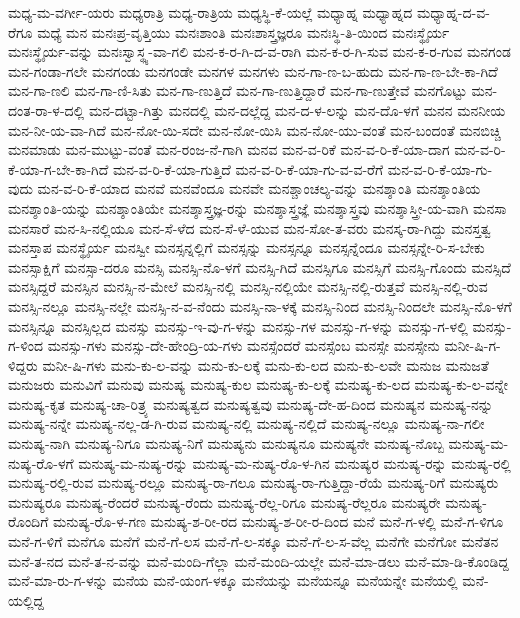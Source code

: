 {ಮಧ್ಯ-ಮ-ವರ್ಗೀ-ಯರು
ಮಧ್ಯರಾತ್ರಿ
ಮಧ್ಯ-ರಾತ್ರಿಯ
ಮಧ್ಯಸ್ಥಿ-ಕೆ-ಯಲ್ಲೆ
ಮಧ್ಯಾಹ್ನ
ಮಧ್ಯಾಹ್ನದ
ಮಧ್ಯಾಹ್ನ-ದ-ವ-ರೆಗೂ
ಮಧ್ಯೆ
ಮನ
ಮನಃಪ್ರ-ವೃತ್ತಿಯು
ಮನಃಶಾಂತಿ
ಮನಃಶಾಸ್ತ್ರಜ್ಞರೂ
ಮನಃಸ್ಥಿ-ತಿ-ಯಿಂದ
ಮನಃಸ್ಥೈರ್ಯ
ಮನಃಸ್ಥೈರ್ಯ-ವನ್ನು
ಮನಃಸ್ವಾಸ್ಥ್ಯ-ವಾ-ಗಲಿ
ಮನ-ಕ-ರ-ಗಿ-ದ-ವ-ರಾಗಿ
ಮನ-ಕ-ರ-ಗಿ-ಸುವ
ಮನ-ಕ-ರ-ಗುವ
ಮನಗಂಡ
ಮನ-ಗಂಡಾ-ಗಲೇ
ಮನಗಂಡು
ಮನಗಂಡೇ
ಮನಗಳ
ಮನಗಳು
ಮನ-ಗಾ-ಣ-ಬ-ಹುದು
ಮನ-ಗಾ-ಣ-ಬೇ-ಕಾ-ಗಿದೆ
ಮನ-ಗಾ-ಣಲಿ
ಮನ-ಗಾ-ಣಿ-ಸಿತು
ಮನ-ಗಾ-ಣುತ್ತಿದೆ
ಮನ-ಗಾ-ಣುತ್ತಿದ್ದಾರೆ
ಮನ-ಗಾ-ಣುತ್ತೇವೆ
ಮನಗೊಟ್ಟು
ಮನ-ದಂತ-ರಾ-ಳ-ದಲ್ಲಿ
ಮನ-ದಟ್ಟಾ-ಗಿತ್ತು
ಮನದಲ್ಲಿ
ಮನ-ದಲ್ಲೆದ್ದ
ಮನ-ದ-ಳ-ಲನ್ನು
ಮನ-ದೊ-ಳಗೆ
ಮನನ
ಮನನೀಯ
ಮನ-ನೀ-ಯ-ವಾ-ಗಿದೆ
ಮನ-ನೋ-ಯಿ-ಸದೇ
ಮನ-ನೋ-ಯಿಸಿ
ಮನ-ನೋ-ಯು-ವಂತೆ
ಮನ-ಬಂದಂತೆ
ಮನಬಿಚ್ಚಿ
ಮನಮಾಡು
ಮನ-ಮುಟ್ಟು-ವಂತೆ
ಮನ-ರಂಜ-ನೆ-ಗಾಗಿ
ಮನವ
ಮನ-ವ-ರಿಕೆ
ಮನ-ವ-ರಿ-ಕೆ-ಯಾ-ದಾಗ
ಮನ-ವ-ರಿ-ಕೆ-ಯಾ-ಗ-ಬೇ-ಕಾ-ಗಿದೆ
ಮನ-ವ-ರಿ-ಕೆ-ಯಾ-ಗುತ್ತಿದೆ
ಮನ-ವ-ರಿ-ಕೆ-ಯಾ-ಗು-ವ-ವ-ರೆಗೆ
ಮನ-ವ-ರಿ-ಕೆ-ಯಾ-ಗು-ವುದು
ಮನ-ವ-ರಿ-ಕೆ-ಯಾದ
ಮನವೆ
ಮನವೆಂದೂ
ಮನವೇ
ಮನಶ್ಚಾಂಚಲ್ಯ-ವನ್ನು
ಮನಶ್ಶಾಂತಿ
ಮನಶ್ಶಾಂತಿಯ
ಮನಶ್ಶಾಂತಿ-ಯನ್ನು
ಮನಶ್ಶಾಂತಿಯೇ
ಮನಶ್ಶಾಸ್ತ್ರಜ್ಞ-ರನ್ನು
ಮನಶ್ಶಾಸ್ತ್ರಜ್ಞೆ
ಮನಶ್ಶಾಸ್ತ್ರವು
ಮನಶ್ಶಾಸ್ತ್ರೀ-ಯ-ವಾಗಿ
ಮನಸಾ
ಮನಸಾರೆ
ಮನ-ಸಿ-ನಲ್ಲಿಯೂ
ಮನ-ಸೆ-ಳೆದ
ಮನ-ಸೆ-ಳೆ-ಯುವ
ಮನ-ಸೋ-ತ-ವರು
ಮನಸ್ಕ-ರಾ-ಗಿದ್ದು
ಮನಸ್ತತ್ವ
ಮನಸ್ತಾಪ
ಮನಸ್ಥೈರ್ಯ
ಮನಸ್ವೀ
ಮನಸ್ಸನ್ನಲ್ಲಿಗೆ
ಮನಸ್ಸನ್ನು
ಮನಸ್ಸನ್ನೂ
ಮನಸ್ಸನ್ನೆಂದೂ
ಮನಸ್ಸನ್ನೇ-ರಿ-ಸ-ಬೇಕು
ಮನಸ್ಸಾಕ್ಷಿಗೆ
ಮನಸ್ಸಾ-ದರೂ
ಮನಸ್ಸಿ
ಮನಸ್ಸಿ-ನೊ-ಳಗೆ
ಮನಸ್ಸಿ-ಗಿದೆ
ಮನಸ್ಸಿಗೂ
ಮನಸ್ಸಿಗೆ
ಮನಸ್ಸಿ-ಗೊಂದು
ಮನಸ್ಸಿದೆ
ಮನಸ್ಸಿದ್ದರೆ
ಮನಸ್ಸಿನ
ಮನಸ್ಸಿ-ನ-ಮೇಲೆ
ಮನಸ್ಸಿ-ನಲ್ಲಿ
ಮನಸ್ಸಿ-ನಲ್ಲಿಯೇ
ಮನಸ್ಸಿ-ನಲ್ಲಿ-ರುತ್ತವೆ
ಮನಸ್ಸಿ-ನಲ್ಲಿ-ರುವ
ಮನಸ್ಸಿ-ನಲ್ಲೂ
ಮನಸ್ಸಿ-ನಲ್ಲೇ
ಮನಸ್ಸಿ-ನ-ವ-ನೆಂದು
ಮನಸ್ಸಿ-ನಾ-ಳಕ್ಕೆ
ಮನಸ್ಸಿ-ನಿಂದ
ಮನಸ್ಸಿ-ನಿಂದಲೇ
ಮನಸ್ಸಿ-ನೊ-ಳಗೆ
ಮನಸ್ಸಿನ್ನೂ
ಮನಸ್ಸಿಲ್ಲದ
ಮನಸ್ಸು
ಮನಸ್ಸು-ಇ-ವು-ಗ-ಳನ್ನು
ಮನಸ್ಸು-ಗಳ
ಮನಸ್ಸು-ಗ-ಳನ್ನು
ಮನಸ್ಸು-ಗ-ಳಲ್ಲಿ
ಮನಸ್ಸು-ಗ-ಳಿಂದ
ಮನಸ್ಸು-ಗಳು
ಮನಸ್ಸು-ದೇ-ಹೇಂದ್ರಿ-ಯ-ಗಳು
ಮನಸ್ಸೆಂದರೆ
ಮನಸ್ಸೆಂಬ
ಮನಸ್ಸೇ
ಮನಸ್ಸೇನು
ಮನೀ-ಷಿ-ಗ-ಳಿದ್ದರು
ಮನೀ-ಷಿ-ಗಳು
ಮನು-ಕು-ಲ-ವನ್ನು
ಮನು-ಕು-ಲಕ್ಕೆ
ಮನು-ಕು-ಲದ
ಮನು-ಕು-ಲವೇ
ಮನುಜ
ಮನುಜತೆ
ಮನುಜರು
ಮನುವಿಗೆ
ಮನುವು
ಮನುಷ್ಯ
ಮನುಷ್ಯ-ಕುಲ
ಮನುಷ್ಯ-ಕು-ಲಕ್ಕೆ
ಮನುಷ್ಯ-ಕು-ಲದ
ಮನುಷ್ಯ-ಕು-ಲ-ವನ್ನೇ
ಮನುಷ್ಯ-ಕೃತ
ಮನುಷ್ಯ-ಚಾ-ರಿತ್ರ್ಯ
ಮನುಷ್ಯತ್ವದ
ಮನುಷ್ಯತ್ವವು
ಮನುಷ್ಯ-ದೇ-ಹ-ದಿಂದ
ಮನುಷ್ಯನ
ಮನುಷ್ಯ-ನನ್ನು
ಮನುಷ್ಯ-ನನ್ನೇ
ಮನುಷ್ಯ-ನಲ್ಲ-ಡ-ಗಿ-ರುವ
ಮನುಷ್ಯ-ನಲ್ಲಿ
ಮನುಷ್ಯ-ನಲ್ಲಿದೆ
ಮನುಷ್ಯ-ನಲ್ಲೂ
ಮನುಷ್ಯ-ನಾ-ಗಲೀ
ಮನುಷ್ಯ-ನಾಗಿ
ಮನುಷ್ಯ-ನಿಗೂ
ಮನುಷ್ಯ-ನಿಗೆ
ಮನುಷ್ಯನು
ಮನುಷ್ಯನೂ
ಮನುಷ್ಯನೇ
ಮನುಷ್ಯ-ನೊಬ್ಬ
ಮನುಷ್ಯ-ಮ-ನುಷ್ಯ-ರೊ-ಳಗೆ
ಮನುಷ್ಯ-ಮ-ನುಷ್ಯ-ರನ್ನು
ಮನುಷ್ಯ-ಮ-ನುಷ್ಯ-ರೊ-ಳ-ಗಿನ
ಮನುಷ್ಯರ
ಮನುಷ್ಯ-ರನ್ನು
ಮನುಷ್ಯ-ರಲ್ಲಿ
ಮನುಷ್ಯ-ರಲ್ಲಿ-ರುವ
ಮನುಷ್ಯ-ರಲ್ಲೂ
ಮನುಷ್ಯ-ರಾ-ಗಲೂ
ಮನುಷ್ಯ-ರಾ-ಗುತ್ತಿದ್ದಾ-ರೆಯೆ
ಮನುಷ್ಯ-ರಿಗೆ
ಮನುಷ್ಯರು
ಮನುಷ್ಯರೂ
ಮನುಷ್ಯ-ರೆಂದರೆ
ಮನುಷ್ಯ-ರೆಂದು
ಮನುಷ್ಯ-ರೆಲ್ಲ-ರಿಗೂ
ಮನುಷ್ಯ-ರೆಲ್ಲರೂ
ಮನುಷ್ಯರೇ
ಮನುಷ್ಯ-ರೊಂದಿಗೆ
ಮನುಷ್ಯ-ರೊ-ಳ-ಗಣ
ಮನುಷ್ಯ-ಶ-ರೀ-ರದ
ಮನುಷ್ಯ-ಶ-ರೀ-ರ-ದಿಂದ
ಮನೆ
ಮನೆ-ಗ-ಳಲ್ಲಿ
ಮನೆ-ಗ-ಳಿಗೂ
ಮನೆ-ಗ-ಳಿಗೆ
ಮನೆಗೂ
ಮನೆಗೆ
ಮನೆ-ಗೆ-ಲಸ
ಮನೆ-ಗೆ-ಲ-ಸಕ್ಕೂ
ಮನೆ-ಗೆ-ಲ-ಸ-ವೆಲ್ಲ
ಮನೆಗೇ
ಮನೆಗೋ
ಮನೆತನ
ಮನೆ-ತ-ನದ
ಮನೆ-ತ-ನ-ವನ್ನು
ಮನೆ-ಮಂದಿ-ಗೆಲ್ಲಾ
ಮನೆ-ಮಂದಿ-ಯಲ್ಲೇ
ಮನೆ-ಮಾ-ಡಲು
ಮನೆ-ಮಾ-ಡಿ-ಕೊಂಡಿದ್ದ
ಮನೆ-ಮಾ-ರು-ಗ-ಳನ್ನು
ಮನೆಯ
ಮನೆ-ಯಂಗ-ಳಕ್ಕೂ
ಮನೆಯನ್ನು
ಮನೆಯನ್ನೂ
ಮನೆಯನ್ನೇ
ಮನೆಯಲ್ಲಿ
ಮನೆ-ಯಲ್ಲಿದ್ದ
}
